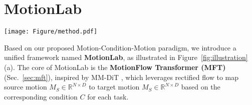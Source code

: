 \section{MotionLab}
\label{sec:method}

\begin{figure*}[!t]
  \centering
  \texttt{[image: Figure/method.pdf]}
  \vspace{-5mm}
  \caption{Illustration of our MotionLab and the detail of its MotionFlow Transformer (MFT).}
  \label{fig:illustration}
  \vspace{-4mm}
\end{figure*} 

\begin{table}[!t]
\caption{Structuring human motion tasks within our Motion-Condition-Motion paradigm.}
\vspace{-8mm}
\label{tab:paradigm}
\end{table}


Based on our proposed Motion-Condition-Motion paradigm, we introduce a unified framework named \textbf{MotionLab}, as illustrated in Figure~\ref{fig:illustration}(a). The core of MotionLab is the \textbf{MotionFlow Transformer (MFT)} (Sec.~\ref{sec:mft}), inspired by MM-DiT \cite{esser2024scaling}, which leverages rectified flow to map source motion $M_S \in \mathbb{R}^{N\times D}$ to target motion $M_S \in \mathbb{R}^{N\times D}$ based on the corresponding condition $C$ for each task.

